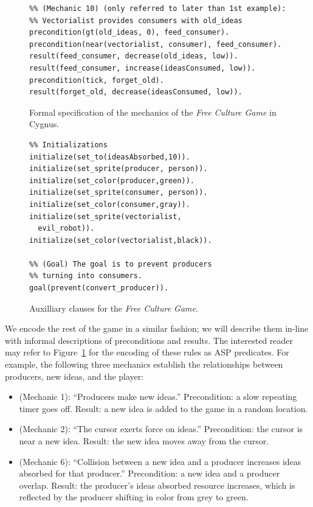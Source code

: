 \documentclass[12pt]{report}
\begin{document}
\begin{figure}[htbp!]
\begin{verbatim}
%% (Mechanic 10) (only referred to later than 1st example):
%% Vectorialist provides consumers with old_ideas
precondition(gt(old_ideas, 0), feed_consumer).
precondition(near(vectorialist, consumer), feed_consumer).
result(feed_consumer, decrease(old_ideas, low)).
result(feed_consumer, increase(ideasConsumed, low)).
precondition(tick, forget_old).
result(forget_old, decrease(ideasConsumed, low)).
\end{verbatim}

\caption{\vspace{-1\baselineskip}Formal specification of the mechanics of the \textit{Free Culture Game} in Cygnus.}
\label{fig:fcgformal}
\end{figure}

\begin{figure}
\begin{verbatim}
%% Initializations
initialize(set_to(ideasAbsorbed,10)).
initialize(set_sprite(producer, person)).
initialize(set_color(producer,green)).
initialize(set_sprite(consumer, person)).
initialize(set_color(consumer,gray)).
initialize(set_sprite(vectorialist, 
  evil_robot)).
initialize(set_color(vectorialist,black)).

%% (Goal) The goal is to prevent producers 
%% turning into consumers.
goal(prevent(convert_producer)).
\end{verbatim}
\caption{Auxilliary clauses for the \textit{Free Culture Game}.}
\label{fig:fcgaux}
\end{figure}

We encode the rest of the game in a similar fashion; we will describe them
in-line with informal descriptions of preconditions and results. The
interested reader may refer to Figure~\ref{fig:fcgformal} for the encoding of
these rules as ASP predicates.
For example, the following three mechanics establish the relationships
between producers, new ideas, and the player:

\begin{itemize}

\item (Mechanic 1): ``Producers make new ideas.'' Precondition: a slow
repeating timer goes off. Result: a new idea is added to the game in a
random location.

\item (Mechanic 2): ``The cursor exerts force on ideas.'' Precondition: the
cursor is near a new idea. Result: the new idea moves away from the cursor.

\item (Mechanic 6): ``Collision between a new idea and a producer increases
ideas absorbed for that producer.'' Precondition: a new idea and a producer
overlap. Result: the producer's ideas absorbed resource increases, which is
reflected by the producer shifting in color from grey to green.

\end{itemize}
\end{document}
